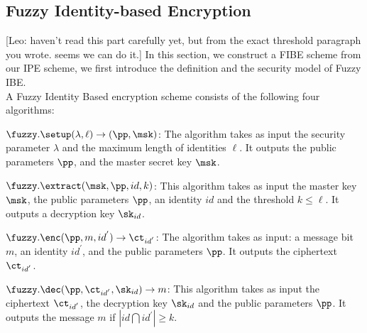 \documentclass[11pt,hidelinks]{article}
\newcommand{\leo}[1]{{\color{cyan}[Leo: #1]}}
\begin{document}
\begin{appendix}
\section{Fuzzy Identity-based Encryption}
\leo{haven't read this part carefully yet, but from the exact threshold paragraph you wrote. seems we can do it.}
In this section, we construct a FIBE scheme from our IPE scheme, we first introduce the definition and the security model of Fuzzy IBE.\\[0.4cm]
A Fuzzy Identity Based encryption scheme consists of the following four algorithms:
\begin{description}
 \item $\fuzzy.\setup(\lambda, \ell)\rightarrow (\pp, \msk)$: The algorithm takes as input the security parameter $\lambda$ and the maximum length of identities $\ell$. It outputs the public parameters $\pp$, and the master secret key $\msk$.
 \item $\fuzzy.\extract(\msk, \pp, id, k)$: This algorithm takes as input the master key $\msk$, the public parameters $\pp$, an identity $id$ and the threshold  $k\leq \ell$. It outputs a decryption key $\sk_{id}$.
 \item $\fuzzy.\enc(\pp, m, id^{'}) \rightarrow \ct_{id^{'}}$: The algorithm takes as input: a message bit $m$, an identity $id^{'}$, and the public parameters $\pp$. It outputs the ciphertext $\ct_{id^{'}}$.
 \item $\fuzzy.\dec(\pp, \ct_{id^{'}}, \sk_{id})\rightarrow m$: This algorithm takes as input the ciphertext $\ct_{id^{'}}$, the decryption key $\sk_{id}$ and the public parameters $\pp$. It outputs the message $m$ if $|id \bigcap id^{'}| \geq k$.
\end{description}

\end{appendix}
\end{document}
